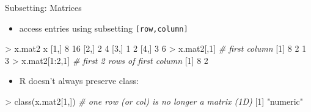 \documentclass[
  ignorenonframetext,
]{beamer}
\newenvironment{Shaded}{\begin{snugshade}}{\end{snugshade}}
\newcommand{\CommentTok}[1]{\textcolor[rgb]{0.56,0.35,0.01}{\textit{#1}}}
\newcommand{\DecValTok}[1]{\textcolor[rgb]{0.00,0.00,0.81}{#1}}
\newcommand{\FunctionTok}[1]{\textcolor[rgb]{0.00,0.00,0.00}{#1}}
\newcommand{\NormalTok}[1]{#1}
\newcommand{\SpecialCharTok}[1]{\textcolor[rgb]{0.00,0.00,0.00}{#1}}
\newcommand{\StringTok}[1]{\textcolor[rgb]{0.31,0.60,0.02}{#1}}
\providecommand{\tightlist}{%
  \setlength{\itemsep}{0pt}\setlength{\parskip}{0pt}}
\begin{document}
\begin{frame}[fragile]{Subsetting: Matrices}
\protect\hypertarget{subsetting-matrices}{}
\begin{itemize}[<+->]
\tightlist
\item
  access entries using subsetting \texttt{{[}row,column{]}}
\end{itemize}

\begin{Shaded}
\begin{Highlighting}[]
\SpecialCharTok{\textgreater{}}\NormalTok{ x.mat2}
\NormalTok{     x   }
\NormalTok{[}\DecValTok{1}\NormalTok{,] }\DecValTok{8} \DecValTok{16}
\NormalTok{[}\DecValTok{2}\NormalTok{,] }\DecValTok{2}  \DecValTok{4}
\NormalTok{[}\DecValTok{3}\NormalTok{,] }\DecValTok{1}  \DecValTok{2}
\NormalTok{[}\DecValTok{4}\NormalTok{,] }\DecValTok{3}  \DecValTok{6}
\SpecialCharTok{\textgreater{}}\NormalTok{ x.mat2[,}\DecValTok{1}\NormalTok{] }\CommentTok{\# first column}
\NormalTok{[}\DecValTok{1}\NormalTok{] }\DecValTok{8} \DecValTok{2} \DecValTok{1} \DecValTok{3}
\SpecialCharTok{\textgreater{}}\NormalTok{ x.mat2[}\DecValTok{1}\SpecialCharTok{:}\DecValTok{2}\NormalTok{,}\DecValTok{1}\NormalTok{] }\CommentTok{\# first 2 rows of first column}
\NormalTok{[}\DecValTok{1}\NormalTok{] }\DecValTok{8} \DecValTok{2}
\end{Highlighting}
\end{Shaded}

\begin{itemize}[<+->]
\tightlist
\item
  R doesn't always preserve class:
\end{itemize}

\begin{Shaded}
\begin{Highlighting}[]
\SpecialCharTok{\textgreater{}} \FunctionTok{class}\NormalTok{(x.mat2[}\DecValTok{1}\NormalTok{,])  }\CommentTok{\# one row (or col) is no longer a matrix (1D)}
\NormalTok{[}\DecValTok{1}\NormalTok{] }\StringTok{"numeric"}
\end{Highlighting}
\end{Shaded}
\end{frame}
\end{document}
